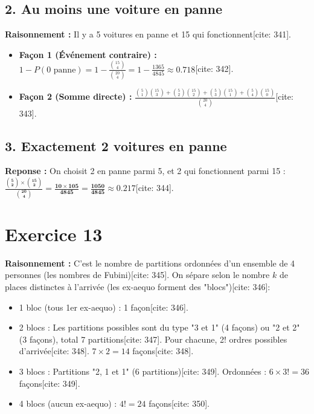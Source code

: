 \documentclass[11pt,a4paper]{article}
\begin{document}
\subsection*{2. Au moins une voiture en panne}

\textbf{Raisonnement :} Il y a 5 voitures en panne et 15 qui fonctionnent[cite: 341].
\begin{itemize}
    \item \textbf{Façon 1 (Événement contraire) :} $1 - P(\text{0 panne}) = 1 - \frac{\binom{15}{4}}{\binom{20}{4}} = 1 - \frac{1365}{4845} \approx 0.718$[cite: 342].
    \item \textbf{Façon 2 (Somme directe) :} $\frac{\binom{5}{1}\binom{15}{3} + \binom{5}{2}\binom{15}{2} + \binom{5}{3}\binom{15}{1} + \binom{5}{4}\binom{15}{0}}{\binom{20}{4}}$[cite: 343].
\end{itemize}

\subsection*{3. Exactement 2 voitures en panne}

\textbf{Reponse :} On choisit 2 en panne parmi 5, et 2 qui fonctionnent parmi 15 : $\mathbf{\frac{\binom{5}{2} \times \binom{15}{2}}{\binom{20}{4}} = \frac{10 \times 105}{4845} = \frac{1050}{4845} \approx 0.217}$[cite: 344].

\hrulefill

\section*{Exercice 13}

\textbf{Raisonnement :} C'est le nombre de partitions ordonnées d'un ensemble de 4 personnes (les nombres de Fubini)[cite: 345]. On sépare selon le nombre $k$ de places distinctes à l'arrivée (les ex-aequo forment des "blocs")[cite: 346]:
\begin{itemize}
    \item 1 bloc (tous 1er ex-aequo) : 1 façon[cite: 346].
    \item 2 blocs : Les partitions possibles sont du type "3 et 1" (4 façons) ou "2 et 2" (3 façons), total 7 partitions[cite: 347]. Pour chacune, 2! ordres possibles d'arrivée[cite: 348]. $7 \times 2 = 14$ façons[cite: 348].
    \item 3 blocs : Partitions "2, 1 et 1" (6 partitions)[cite: 349]. Ordonnées : $6 \times 3! = 36$ façons[cite: 349].
    \item 4 blocs (aucun ex-aequo) : $4! = 24$ façons[cite: 350].
\end{itemize}
\end{document}
